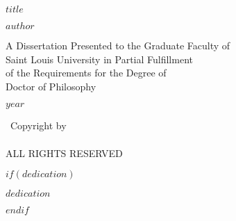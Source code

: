 \documentclass[phdthesis,12pt,final]{wuthesis}
\begin{document}
\begin{titlepage}
\begin{center}
\vspace*{0.5in} %

{\large\MakeUppercase{$title$}\par}

\vspace{1in} %

{\large $author$\par}

\vspace{2in} %

A Dissertation Presented to the Graduate Faculty of\\
Saint Louis University in Partial Fulfillment\\
of the Requirements for the Degree of\\
Doctor of Philosophy

\vfill %

$year$

\end{center}
\end{titlepage}

\setcounter{page}{2}

\cleardoublepage
\thispagestyle{empty}
\begin{thesiscopyrightpage}
    \vspace*{\fill}
    \begin{center}
    \textcopyright\ Copyright by\\
    \thesisauthor\\
    ALL RIGHTS RESERVED\\
    \thesisyear
    \end{center}
    \vspace*{-10cm} %
\end{thesiscopyrightpage}

\cleardoublepage
\begin{thesiscommittee}
\end{thesiscommittee}

$if(dedication)$
\cleardoublepage
\begin{thesisdedicationpage}
$dedication$
\end{thesisdedicationpage}
$endif$
\end{document}
